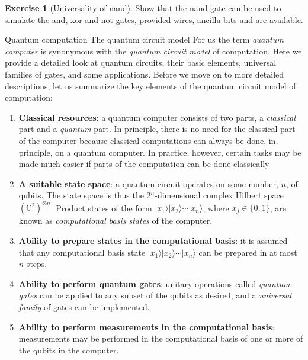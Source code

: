 \documentclass[12pt,oneside]{amsart}
\makeatletter
\def\section{\@startsection{section}{1}%
  \z@{.7\linespacing\@plus\linespacing}{.5\linespacing}%
  {\color{cgblue}\normalfont\sf\bfseries\large\centering}}
\def\subsection{\@startsection{subsection}{2}%
  \z@{.5\linespacing\@plus.7\linespacing}{-.5em}%
  {\color{cgblue}\normalfont\sf\bfseries}}
\theoremstyle{plain}%
\theoremstyle{definition}
\newtheorem{exercise}{\color{cgblue}Exercise}[section]
\theoremstyle{remark}
\makeatother
\begin{document}
\begin{exercise}[Universality of {\sc nand}]
   Show that the {\sc nand} gate can be used to simulate the {\sc and}, {\sc xor} and {\sc not} gates, provided wires, ancilla bits and are available.
\end{exercise}

\section{Quantum computation}
\subsection{The quantum circuit model}
For us the term \emph{quantum computer} is synonymous with the \emph{quantum circuit model} of computation. Here we provide a detailed look at quantum circuits, their basic elements, universal families of gates, and some applications. Before we move on to more detailed descriptions, let us summarize the key elements of the quantum circuit model of computation:
\begin{enumerate}
  \item \textbf{Classical resources}: a quantum computer consists of two parts, a \emph{classical} part and a \emph{quantum} part. In principle, there is no need for the classical part of the computer because classical computations can always be done, in, principle, on a quantum computer. In practice, however, certain tasks may be made much easier if parts of the computation can be done classically
  \item \textbf{A suitable state space}: a quantum circuit operates on some number, $n$, of qubits. The state space is thus the $2^n$-dimensional complex Hilbert space $(\mathbb{C}^2)^{\otimes n}$. Product states of the form  $|x_1\rangle|x_2\rangle\cdots |x_n\rangle$, where $x_j \in \{0,1\}$, are known as \emph{computational basis states} of the computer.
  \item \textbf{Ability to prepare states in the computational basis}: it is assumed that any computational basis state $|x_1\rangle|x_2\rangle\cdots |x_n\rangle$ can be prepared in at most $n$ steps. 
  \item \textbf{Ability to perform quantum gates}: unitary operations called \emph{quantum gates} can be applied to any subset of the qubits as desired, and a \emph{universal family} of gates can be implemented. 
  \item \textbf{Ability to perform measurements in the computational basis}: measurements may be performed in the computational basis of one or more of the qubits in the computer.
\end{enumerate}
\end{document}
